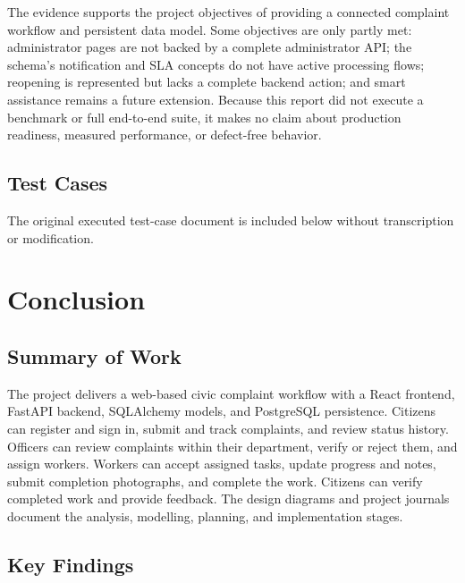 \documentclass[12pt,a4paper]{report}
\begin{document}
The evidence supports the project objectives of providing a connected complaint workflow and persistent data model. Some objectives are only partly met: administrator pages are not backed by a complete administrator API; the schema's notification and SLA concepts do not have active processing flows; reopening is represented but lacks a complete backend action; and smart assistance remains a future extension. Because this report did not execute a benchmark or full end-to-end suite, it makes no claim about production readiness, measured performance, or defect-free behavior.



\clearpage
\section{Test Cases}
The original executed test-case document is included below without
transcription or modification.



\chapter{Conclusion}

\section{Summary of Work}

The project delivers a web-based civic complaint workflow with a React frontend, FastAPI backend, SQLAlchemy models, and PostgreSQL persistence. Citizens can register and sign in, submit and track complaints, and review status history. Officers can review complaints within their department, verify or reject them, and assign workers. Workers can accept assigned tasks, update progress and notes, submit completion photographs, and complete the work. Citizens can verify completed work and provide feedback. The design diagrams and project journals document the analysis, modelling, planning, and implementation stages.

\section{Key Findings}
\end{document}
